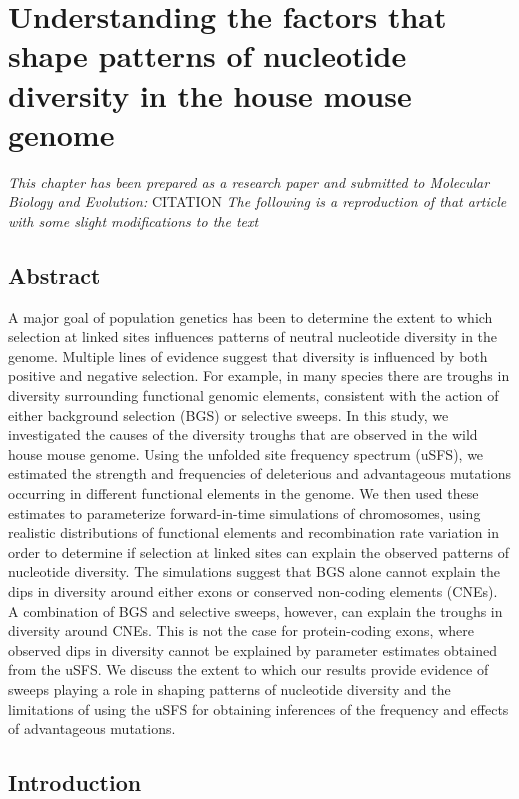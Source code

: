 \chapter{Understanding the factors that shape patterns of nucleotide diversity in the house mouse genome}

\emph{This chapter has been prepared as a research paper and submitted to Molecular Biology and Evolution:}
CITATION
\emph{The following is a reproduction of that article with some slight modifications to the text}

\section{Abstract}
	A major goal of population genetics has been to determine the extent to which selection at linked sites influences patterns of neutral nucleotide diversity in the genome. Multiple lines of evidence suggest that diversity is influenced by both positive and negative selection. For example, in many species there are troughs in diversity surrounding functional genomic elements, consistent with the action of either background selection (BGS) or selective sweeps. In this study, we investigated the causes of the diversity troughs that are observed in the wild house mouse genome. Using the unfolded site frequency spectrum (uSFS), we estimated the strength and frequencies of deleterious and advantageous mutations occurring in different functional elements in the genome. We then used these estimates to parameterize forward-in-time simulations of chromosomes, using realistic distributions of functional elements and recombination rate variation in order to determine if selection at linked sites can explain the observed patterns of nucleotide diversity. The simulations suggest that BGS alone cannot explain the dips in diversity around either exons or conserved non-coding elements (CNEs). A combination of BGS and selective sweeps, however, can explain the troughs in diversity around CNEs. This is not the case for protein-coding exons, where observed dips in diversity cannot be explained by parameter estimates obtained from the uSFS. We discuss the extent to which our results provide evidence of sweeps playing a role in shaping patterns of nucleotide diversity and the limitations of using the uSFS for obtaining inferences of the frequency and effects of advantageous mutations.


\section{Introduction}
 
